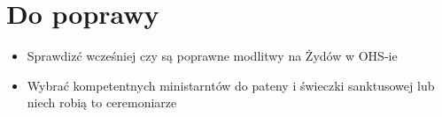     \newpage

\section{Do poprawy}
  \begin{itemize}
    \item Sprawdizć wcześniej czy są poprawne modlitwy na Żydów w OHS-ie
    \item Wybrać kompetentnych ministarntów do pateny i świeczki sanktusowej lub niech robią to ceremoniarze
  \end{itemize}